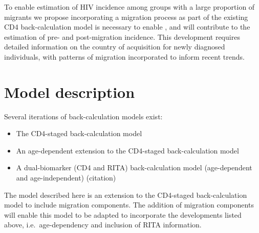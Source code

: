 \documentclass[11pt, a4paper]{article}
\begin{document}
To enable estimation of HIV incidence among groups with a large proportion of migrants we propose incorporating a migration process as part of the existing CD4 back-calculation model is necessary to enable , and will contribute to the estimation of pre- and post-migration incidence. This development requires detailed information on the country of acquisition for newly diagnosed individuals, with patterns of migration incorporated to inform recent trends.



\section{Model description}\label{sec:model-description}

Several iterations of back-calculation models exist:
%
\begin{itemize}
    \item The CD4-staged back-calculation model~\parencite{birrell_estimating_2012}
    \item An age-dependent extension to the CD4-staged back-calculation model~\parencite{brizzi_extending_2019}
    \item A dual-biomarker (CD4 and RITA) back-calculation model (age-dependent and age-independent) (citation)
\end{itemize}

The model described here is an extension to the CD4-staged back-calculation model to include migration components. The addition of migration components will enable this model to be adapted to incorporate the developments listed above, i.e.\ age-dependency and inclusion of RITA information.
\end{document}
